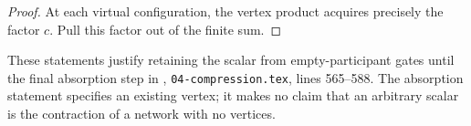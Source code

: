 \begin{proof}\leanok
    At each virtual configuration, the vertex product acquires precisely
    the factor $c$. Pull this factor out of the finite sum.
\end{proof}

These statements justify retaining the scalar from empty-participant gates
until the final absorption step in
\cite[proof of Theorem~5.2]{OpenAI2026PolynomialPEPS},
\texttt{04-compression.tex}, lines 565--588.
The absorption statement specifies an existing vertex; it makes no claim
that an arbitrary scalar is the contraction of a network with no vertices.
